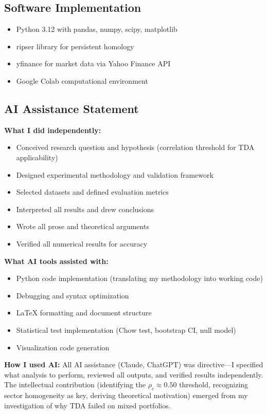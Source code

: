 \documentclass[12pt,letterpaper]{article}
\begin{document}
\subsection{Software Implementation}
\begin{itemize}
    \item Python 3.12 with pandas, numpy, scipy, matplotlib
    \item ripser library for persistent homology
    \item yfinance for market data via Yahoo Finance API
    \item Google Colab computational environment
\end{itemize}

\subsection{AI Assistance Statement}

\textbf{What I did independently:}
\begin{itemize}
    \item Conceived research question and hypothesis (correlation threshold for TDA applicability)
    \item Designed experimental methodology and validation framework
    \item Selected datasets and defined evaluation metrics
    \item Interpreted all results and drew conclusions
    \item Wrote all prose and theoretical arguments
    \item Verified all numerical results for accuracy
\end{itemize}

\textbf{What AI tools assisted with:}
\begin{itemize}
    \item Python code implementation (translating my methodology into working code)
    \item Debugging and syntax optimization
    \item LaTeX formatting and document structure
    \item Statistical test implementation (Chow test, bootstrap CI, null model)
    \item Visualization code generation
\end{itemize}

\textbf{How I used AI:} All AI assistance (Claude, ChatGPT) was directive---I specified what analysis to perform, reviewed all outputs, and verified results independently. The intellectual contribution (identifying the $\rho_c \approx 0.50$ threshold, recognizing sector homogeneity as key, deriving theoretical motivation) emerged from my investigation of why TDA failed on mixed portfolios.
\end{document}
